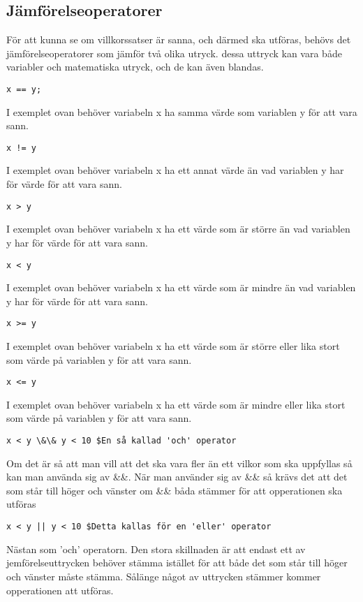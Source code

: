 \documentclass[12pt]{TDP019}
\begin{document}
\subsection{Jämförelseoperatorer}
För att kunna se om villkorssatser är sanna, och därmed ska utföras, behövs det jämförelseoperatorer som jämför två olika utryck. dessa uttryck kan vara både variabler och matematiska utryck, och de kan även blandas.
\begin{verbatim}
x == y;
\end{verbatim}
I exemplet ovan behöver variabeln x ha samma värde som variablen y för att vara sann.
\begin{verbatim}
x != y
\end{verbatim}
I exemplet ovan behöver variabeln x ha ett annat värde än vad variablen y har för värde för att vara sann.
\begin{verbatim}
x > y
\end{verbatim}
I exemplet ovan behöver variabeln x ha ett värde som är större än vad variablen y har för värde för att vara sann.
\begin{verbatim}
x < y
\end{verbatim}
I exemplet ovan behöver variabeln x ha ett värde som är mindre än vad variablen y har för värde för att vara sann.
\begin{verbatim}
x >= y
\end{verbatim}
I exemplet ovan behöver variabeln x ha ett värde som är större eller lika stort som värde på variablen y för att vara sann.
\begin{verbatim}
x <= y
\end{verbatim}
I exemplet ovan behöver variabeln x ha ett värde som är mindre eller lika stort som värde på variablen y för att vara sann.
\begin{verbatim}
x < y \&\& y < 10 $En så kallad 'och' operator
\end{verbatim}
Om det är så att man vill att det ska vara fler än ett vilkor som ska uppfyllas så kan man använda sig av \&\&. När man använder sig av \&\& så krävs det att det som står till höger och vänster om \&\& båda stämmer för att opperationen ska utföras
\begin{verbatim}
x < y || y < 10 $Detta kallas för en 'eller' operator
\end{verbatim}
Nästan som 'och' operatorn. Den stora skillnaden är att endast ett av jemförelseuttrycken behöver stämma istället för att både det som står till höger och vänster måste stämma. Sålänge något av uttrycken stämmer kommer opperationen att utföras.
\end{document}
